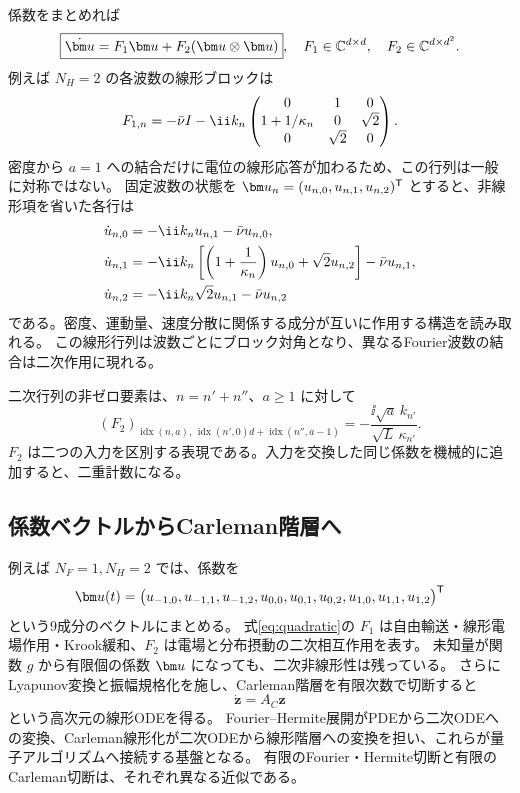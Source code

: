 係数をまとめれば
\begin{equation}
\boxed{\dot\uu=F_1\uu+F_2(\uu\otimes\uu)},\quad
F_1\in\mathbb C^{d\times d},\quad F_2\in\mathbb C^{d\times d^2}.
\label{eq:quadratic}
\end{equation}
例えば $N_H=2$ の各波数の線形ブロックは
\begin{equation}
F_{1,n}=-\nuu I-\ii k_n
\begin{pmatrix}
0&1&0\\
1+1/\kappa_n&0&\sqrt2\\
0&\sqrt2&0
\end{pmatrix}.
\label{eq:block}
\end{equation}
密度から $a=1$ への結合だけに電位の線形応答が加わるため、この行列は一般に対称ではない。
固定波数の状態を $\uu_n=(u_{n,0},u_{n,1},u_{n,2})^{\mathsf T}$ とすると、非線形項を省いた各行は
\begin{align*}
\dot u_{n,0}&=-\ii k_nu_{n,1}-\nuu u_{n,0},\\
\dot u_{n,1}&=-\ii k_n\left[\left(1+\frac1{\kappa_n}\right)u_{n,0}
+\sqrt2u_{n,2}\right]-\nuu u_{n,1},\\
\dot u_{n,2}&=-\ii k_n\sqrt2u_{n,1}-\nuu u_{n,2}
\end{align*}
である。密度、運動量、速度分散に関係する成分が互いに作用する構造を読み取れる。
この線形行列は波数ごとにブロック対角となり、異なるFourier波数の結合は二次作用に現れる。

二次行列の非ゼロ要素は、$n=n'+n''$、$a\geq1$ に対して
\begin{equation}
(F_2)_{\operatorname{idx}(n,a),\,\operatorname{idx}(n',0)d+\operatorname{idx}(n'',a-1)}
=-\frac{\ii\sqrt a\,k_{n'}}{\sqrt L\,\kappa_{n'}}.
\end{equation}
$F_2$ は二つの入力を区別する表現である。入力を交換した同じ係数を機械的に追加すると、二重計数になる。

\subsection{係数ベクトルからCarleman階層へ}
例えば $N_F=1,N_H=2$ では、係数を
\[
\uu(t)=\bigl(u_{-1,0},u_{-1,1},u_{-1,2},
u_{0,0},u_{0,1},u_{0,2},u_{1,0},u_{1,1},u_{1,2}\bigr)^{\mathsf T}
\]
という9成分のベクトルにまとめる。
式\eqref{eq:quadratic}の $F_1$ は自由輸送・線形電場作用・Krook緩和、$F_2$ は電場と分布摂動の二次相互作用を表す。
未知量が関数 $g$ から有限個の係数 $\uu$ になっても、二次非線形性は残っている。
さらにLyapunov変換と振幅規格化を施し、Carleman階層を有限次数で切断すると
\[
\boxed{\dot{\bm z}=A_C\bm z}
\]
という高次元の線形ODEを得る。
Fourier--Hermite展開がPDEから二次ODEへの変換、Carleman線形化が二次ODEから線形階層への変換を担い、これらが量子アルゴリズムへ接続する基盤となる。
有限のFourier・Hermite切断と有限のCarleman切断は、それぞれ異なる近似である。

